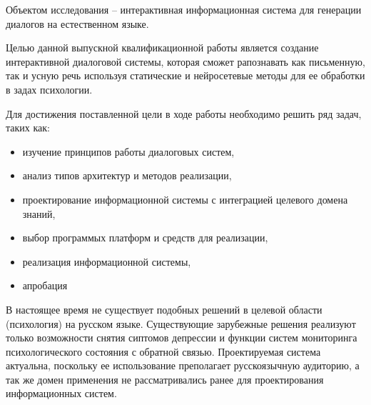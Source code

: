 Объектом исследования – интерактивная информационная система для генерации диалогов на естественном языке. 

Целью данной выпускной квалификационной работы является создание интерактивной диалоговой системы, которая сможет рапознавать как письменную, так и усную речь используя статические и нейросетевые методы для ее обработки в задах психологии.

Для достижения поставленной цели в ходе работы необходимо решить ряд задач, таких как: 
\begin{itemize}
\item изучение принципов работы диалоговых систем,
\item анализ типов архитектур и методов реализации, 
\item проектирование информационной системы с интеграцией целевого домена знаний, 
\item выбор программых платформ и средств для реализации, 
\item реализация информационной системы,
\item апробация
\end{itemize}

В настоящее время не существует подобных решений в целевой области (психология) на русском языке. Существующие зарубежные решения реализуют только возможности снятия сиптомов депрессии и функции систем мониторинга психологического состояния с обратной связью. 
Проектируемая система актуальна, поскольку ее использование преполагает русскоязычную аудиторию, а так же домен применения не рассматривались ранее для проектирования информационных систем. 